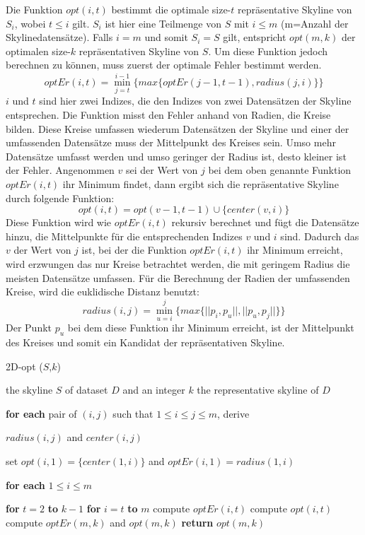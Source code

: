 Die Funktion $opt(i,t)$ bestimmt die optimale size-$t$ repräsentative Skyline von $S_i$, wobei $t \leq i$ gilt. $S_i$ ist hier eine Teilmenge von $S$ mit $i \leq m$ (m=Anzahl der Skylinedatensätze). Falls $i=m$ und somit $S_i=S$ gilt, entspricht $opt(m,k)$ der optimalen size-$k$ repräsentativen Skyline von $S$.
Um diese Funktion jedoch berechnen zu können, muss zuerst der optimale Fehler bestimmt werden.
$$optEr(i,t)=\min\limits_{j=t}^{i-1}\{max\{optEr(j-1,t-1),radius(j,i)\}\}$$
$i$ und $t$ sind hier zwei Indizes, die den Indizes von zwei Datensätzen der Skyline entsprechen. Die Funktion misst den Fehler anhand von Radien, die Kreise bilden. Diese Kreise umfassen wiederum Datensätzen der Skyline und einer der umfassenden Datensätze muss der Mittelpunkt des Kreises sein. Umso mehr Datensätze umfasst werden und umso geringer der Radius ist, desto kleiner ist der Fehler. 
Angenommen $v$ sei der Wert von $j$ bei dem oben genannte Funktion $optEr(i,t)$ ihr Minimum findet, dann ergibt sich die repräsentative Skyline durch folgende Funktion:
$$opt(i,t)=opt(v-1,t-1)\cup\{center(v,i)\}$$
Diese Funktion wird wie $optEr(i,t)$ rekursiv berechnet und fügt die Datensätze hinzu, die Mittelpunkte für die entsprechenden Indizes $v$ und $i$ sind. Dadurch das $v$ der Wert von $j$ ist, bei der die Funktion $optEr(i,t)$ ihr Minimum erreicht, wird erzwungen das nur Kreise betrachtet werden, die mit geringem Radius die meisten Datensätze umfassen.   
Für die Berechnung der Radien der umfassenden Kreise, wird die euklidische Distanz benutzt:
$$radius(i,j)=\min\limits_{u=i}^{j}\{max\{||p_i,p_u||,||p_u,p_j||\}\}$$
Der Punkt $p_u$ bei dem diese Funktion ihr Minimum erreicht, ist der Mittelpunkt des Kreises und somit ein Kandidat der repräsentativen Skyline.

\begin{algorithm}[H]
\caption{2D-opt ($S$,$k$)}\label{algo:2DOpt}
\begin{algorithmic}[1]
\INPUTBF the skyline $S$ of dataset $D$ and an integer $k$
\OUTPUTBF the representative skyline of $D$
\State \parbox[t]{\dimexpr\linewidth-\algorithmicindent}{\textbf{for each} pair of $(i,j)$ such that $1 \leq i \leq j \leq m$, derive\par 
$radius(i,j)$ and $center(i,j)$\strut}
\State \parbox[t]{\dimexpr\linewidth-\algorithmicindent}{set $opt(i,1) = \{center(1,i)\}$ and $optEr(i,1)=radius(1,i)$\par
\textbf{for each} $1 \leq i \leq m$\strut}
\State \textbf{for} $t=2$ \textbf{to} $k-1$
\State \hspace{\algorithmicindent} \textbf{for} $i=t$ \textbf{to} $m$
\State \hspace{\algorithmicindent}\hspace{\algorithmicindent} compute $optEr(i,t)$
\State \hspace{\algorithmicindent}\hspace{\algorithmicindent} compute $opt(i,t)$
\State compute $optEr(m,k)$ and $opt(m,k)$
\State \textbf{return} $opt(m,k)$
\end{algorithmic}
\end{algorithm}

